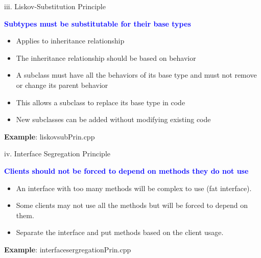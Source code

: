 \documentclass[13pt]{beamer}
\begin{document}
\begin{frame}{iii. Liskov-Substitution Principle}
	\begin{center}
		\textcolor{blue}{\textbf{Subtypes must be substitutable for their base types}}
	\end{center}
	
	\begin{itemize}
		\setlength\itemsep{1em}
		\item Applies to inheritance relationship
		\item The inheritance relationship should be based on behavior
		\item A subclass must have all the behaviors of its base type and must not remove or change its parent behavior
		\item This allows a subclass to replace its base type in code
		\item New subclasses can be added without modifying existing code
	\end{itemize}
	\textbf{Example}: liskovsubPrin.cpp
\end{frame}

\begin{frame}{iv. Interface Segregation Principle}
	\begin{center}
		\textcolor{blue}{\textbf{Clients should not be forced to depend on methods they do not 			use}}
	\end{center}
	
	\begin{itemize}
		\setlength\itemsep{1em}
		\item An interface with too many methods will be complex to use (fat interface).
		\item Some clients may not use all the methods but will be forced to depend on them.
		\item Separate the interface and put methods based on the client usage.
	\end{itemize}
	\textbf{Example}: interfacesergregationPrin.cpp
\end{frame}
\end{document}
